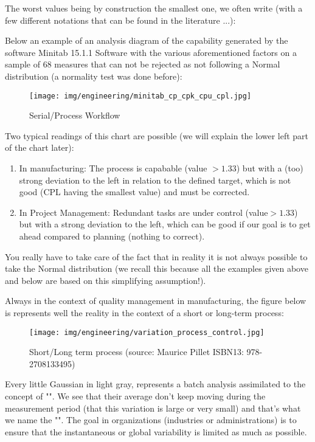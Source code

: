 		The worst values being by construction the smallest one, we often write (with a few different notations that can be found in the literature ...):
		

Below an example of an analysis diagram of the capability generated by the software Minitab 15.1.1 Software with the various aforementioned factors on a sample of 68 measures that can not be rejected as not following a Normal distribution (a normality test was done before):

\begin{figure}[H]
\centering
\texttt{[image: img/engineering/minitab\_cp\_cpk\_cpu\_cpl.jpg]}
\caption{Serial/Process Workflow}
\end{figure}

Two typical readings of this chart are possible (we will explain the lower left part of the chart later):
	\begin{enumerate}
		\item In manufacturing: The process is capabable (value $>1.33$) but with a (too) strong deviation to the left in relation to the defined target, which is not good (CPL having the smallest value) and must be corrected.
		\item In Project Management: Redundant tasks are under control (value$>1.33$) but with a strong deviation to the left, which can be good if our goal is to get ahead compared to planning (nothing to correct).
	\end{enumerate}
	You really have to take care of the fact that in reality it is not always possible to take the Normal distribution (we recall this because all the examples given above and below are based on this simplifying assumption!).
	
	Always in the context of quality management in manufacturing, the figure below is represents well the reality in the context of a short or long-term process:
	
\begin{figure}[H]
\centering
\texttt{[image: img/engineering/variation\_process\_control.jpg]}
\caption{Short/Long term process (source: Maurice Pillet ISBN13: 978-2708133495)}
\end{figure}

	Every little Gaussian in light gray, represents a batch analysis assimilated to the concept of "". We see that their average don't keep moving during the measurement period (that this variation is large or very small) and that's what we name the "". The goal in organizations (industries or administrations) is to ensure that the instantaneous or global variability is limited as much as possible.
	
